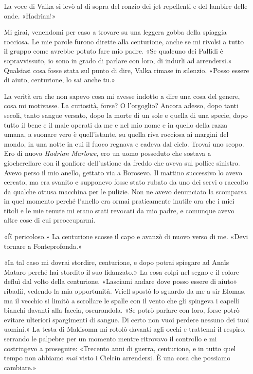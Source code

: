 La voce di Valka si levò al di sopra del ronzio dei jet repellenti e del
lambire delle onde. «Hadrian!»

Mi girai, venendomi per caso a trovare su una leggera gobba della
spiaggia rocciosa. Le mie parole furono dirette alla centurione, anche
se mi rivolsi a tutto il gruppo come avrebbe potuto fare mio padre. «Se
qualcuno dei Pallidi è sopravvissuto, io sono in grado di parlare con
loro, di indurli ad arrendersi.» Qualsiasi cosa fosse stata sul punto di
dire, Valka rimase in silenzio. «Posso essere di aiuto, centurione, lo
sai anche tu.»

La verità era che non sapevo cosa mi avesse indotto a dire una cosa del
genere, cosa mi motivasse. La curiosità, forse? O l'orgoglio? Ancora
adesso, dopo tanti secoli, tanto sangue versato, dopo la morte di un
sole e quella di una specie, dopo tutto il bene e il male operati da me
e nel mio nome e in quello della razza umana, a suonare vero è
quell'istante, su quella riva rocciosa ai margini del mondo, in una
notte in cui il fuoco regnava e cadeva dal cielo. Trovai uno scopo. Ero
di nuovo \emph{Hadrian Marlowe}, ero un uomo posseduto che sostava a
giocherellare con il gonfiore dell'ustione da freddo che aveva sul
pollice sinistro. Avevo perso il mio anello, gettato via a Borosevo. Il
mattino successivo lo avevo cercato, ma era svanito e supponevo fosse
stato rubato da uno dei servi o raccolto da qualche ottusa macchina per
le pulizie. Non ne avevo denunciato la scomparsa in quel momento perché
l'anello era ormai praticamente inutile ora che i miei titoli e le mie
tenute mi erano stati revocati da mio padre, e comunque avevo altre cose
di cui preoccuparmi.

«È pericoloso.» La centurione scosse il capo e avanzò di nuovo verso di
me. «Devi tornare a Fonteprofonda.»

«In tal caso mi dovrai stordire, centurione, e dopo potrai spiegare ad
Anaïs Mataro perché hai stordito il suo fidanzato.» La cosa colpì nel
segno e il colore defluì dal volto della centurione. «Lasciami andare
dove posso essere di aiuto» ribadii, vedendo la mia opportunità. Vriell
spostò lo sguardo da me a sir Elomas, ma il vecchio si limitò a
scrollare le spalle con il vento che gli spingeva i capelli bianchi
davanti alla faccia, oscurandola. «Se potrò parlare con loro, forse
potrò evitare ulteriori spargimenti di sangue. Di certo non vuoi perdere
nessuno dei tuoi uomini.» La testa di Makisomn mi rotolò davanti agli
occhi e trattenni il respiro, serrando le palpebre per un momento mentre
ritrovavo il controllo e mi costringevo a proseguire: «Trecento anni di
guerra, centurione, e in tutto quel tempo non abbiamo \emph{mai} visto i
Cielcin arrendersi. È una cosa che possiamo cambiare.»

